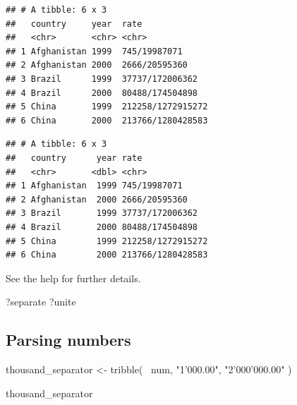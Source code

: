\documentclass[]{book}
\newenvironment{Shaded}{}{}
\newcommand{\DataTypeTok}[1]{#1}
\newcommand{\KeywordTok}[1]{\textcolor[rgb]{0.00,0.00,1.00}{#1}}
\newcommand{\NormalTok}[1]{#1}
\newcommand{\OperatorTok}[1]{#1}
\newcommand{\StringTok}[1]{\textcolor[rgb]{0.00,0.50,0.50}{#1}}
\begin{document}
\begin{verbatim}
## # A tibble: 6 x 3
##   country     year  rate             
##   <chr>       <chr> <chr>            
## 1 Afghanistan 1999  745/19987071     
## 2 Afghanistan 2000  2666/20595360    
## 3 Brazil      1999  37737/172006362  
## 4 Brazil      2000  80488/174504898  
## 5 China       1999  212258/1272915272
## 6 China       2000  213766/1280428583
\end{verbatim}

\begin{Shaded}
\end{Shaded}

\begin{verbatim}
## # A tibble: 6 x 3
##   country      year rate             
##   <chr>       <dbl> <chr>            
## 1 Afghanistan  1999 745/19987071     
## 2 Afghanistan  2000 2666/20595360    
## 3 Brazil       1999 37737/172006362  
## 4 Brazil       2000 80488/174504898  
## 5 China        1999 212258/1272915272
## 6 China        2000 213766/1280428583
\end{verbatim}

See the help for further details.

\begin{Shaded}
\begin{Highlighting}[]
\NormalTok{?separate}
\NormalTok{?unite}
\end{Highlighting}
\end{Shaded}

\hypertarget{parsing-numbers}{%
\subsection{Parsing numbers}\label{parsing-numbers}}

\begin{Shaded}
\begin{Highlighting}[]
\NormalTok{thousand_separator <-}
\StringTok{  }\KeywordTok{tribble}\NormalTok{(}
    \OperatorTok{~}\NormalTok{num,}
    \StringTok{"1'000.00"}\NormalTok{,}
    \StringTok{"2'000'000.00"}
\NormalTok{  )}

\NormalTok{thousand_separator}
\end{Highlighting}
\end{Shaded}
\end{document}
